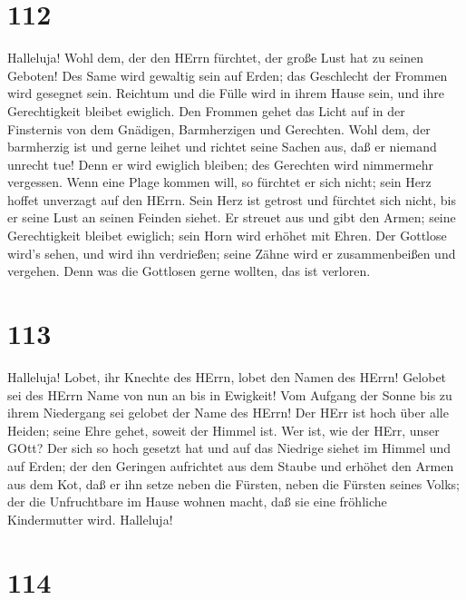 \hypertarget{section-111}{%
\section{112}\label{section-111}}

 Halleluja! Wohl dem, der den HErrn fürchtet, der große Lust
hat zu seinen Geboten!  Des Same wird gewaltig sein auf
Erden; das Geschlecht der Frommen wird gesegnet sein. 
Reichtum und die Fülle wird in ihrem Hause sein, und ihre Gerechtigkeit
bleibet ewiglich.  Den Frommen gehet das Licht auf in der
Finsternis von dem Gnädigen, Barmherzigen und Gerechten. 
Wohl dem, der barmherzig ist und gerne leihet und richtet seine Sachen
aus, daß er niemand unrecht tue!  Denn er wird ewiglich
bleiben; des Gerechten wird nimmermehr vergessen.  Wenn eine
Plage kommen will, so fürchtet er sich nicht; sein Herz hoffet unverzagt
auf den HErrn.  Sein Herz ist getrost und fürchtet sich
nicht, bis er seine Lust an seinen Feinden siehet.  Er
streuet aus und gibt den Armen; seine Gerechtigkeit bleibet ewiglich;
sein Horn wird erhöhet mit Ehren.  Der Gottlose wird's
sehen, und wird ihn verdrießen; seine Zähne wird er zusammenbeißen und
vergehen. Denn was die Gottlosen gerne wollten, das ist verloren.

\hypertarget{section-112}{%
\section{113}\label{section-112}}

 Halleluja! Lobet, ihr Knechte des HErrn, lobet den Namen
des HErrn!  Gelobet sei des HErrn Name von nun an bis in
Ewigkeit!  Vom Aufgang der Sonne bis zu ihrem Niedergang sei
gelobet der Name des HErrn!  Der HErr ist hoch über alle
Heiden; seine Ehre gehet, soweit der Himmel ist.  Wer ist,
wie der HErr, unser GOtt? Der sich so hoch gesetzt hat  und
auf das Niedrige siehet im Himmel und auf Erden;  der den
Geringen aufrichtet aus dem Staube und erhöhet den Armen aus dem Kot,
 daß er ihn setze neben die Fürsten, neben die Fürsten
seines Volks;  der die Unfruchtbare im Hause wohnen macht,
daß sie eine fröhliche Kindermutter wird. Halleluja!

\hypertarget{section-113}{%
\section{114}\label{section-113}}

